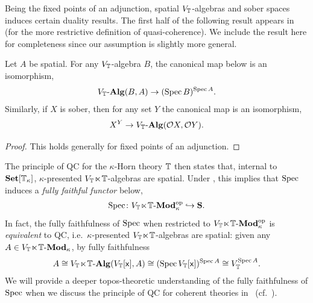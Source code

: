 Being the fixed points of an adjunction, spatial ${V_{\mathbb{T}}}$-algebras and sober spaces induces certain duality results. The first half of the following result appears in~\citet[Prop.~2.2.1]{Cherubini_Coquand_Hutzler_2024} (for the more restrictive definition of quasi-coherence). We include the result here for completeness since our assumption is slightly more general.

\begin{proposition}\label{prop:duality}
  Let $A$ be spatial. For any ${V_{\mathbb{T}}}$-algebra $B$, the canonical map below is an isomorphism,
  \[ {V_{\mathbb{T}}}\text{-}\mathbf{Alg}(B,A) \to (\operatorname{Spec} B)^{\operatorname{Spec} A}. \] 
  Similarly, if $X$ is sober, then for any set $Y$ the canonical map is an isomorphism,
  \[ X^Y \to {V_{\mathbb{T}}}\text{-}\mathbf{Alg}(\mathcal{O} X,\mathcal{O} Y). \] 
\end{proposition}
\begin{proof}
  This holds generally for fixed points of an adjunction.
\end{proof}

\begin{remark}\label{rem:ageneralduality}
  The principle of \gls{QC} for the $\kappa$-Horn theory $\mathbb{T}$ then states that, internal to $\mathbf{Set}[\mathbb{T}_\kappa]$, $\kappa$-presented $V_{\mathbb{T}}\hspace{-.4ex}\ltimes\hspace{-.4ex}\mathbb{T}$-algebras are spatial. Under , this implies that $\operatorname{Spec}$ induces a \emph{fully faithful functor} below,
  \[ \operatorname{Spec} \colon V_{\mathbb{T}}\hspace{-.4ex}\ltimes\hspace{-.4ex}\mathbb{T}\text{-}\mathbf{Mod}_\kappa^{\mathrm{op}} \hookrightarrow \mathbf{S}. \]
  In fact, the fully faithfulness of $\operatorname{Spec}$ when restricted to $V_{\mathbb{T}}\hspace{-.4ex}\ltimes\hspace{-.4ex}\mathbb{T}\text{-}\mathbf{Mod}_\kappa^{\mathrm{op}}$ is \emph{equivalent} to \gls{QC}, i.e.\ $\kappa$-presented $V_{\mathbb{T}}\hspace{-.4ex}\ltimes\hspace{-.4ex}\mathbb{T}$-algebras are spatial: given any $A\in V_{\mathbb{T}}\hspace{-.4ex}\ltimes\hspace{-.4ex}\mathbb{T}\text{-}\mathbf{Mod}_\kappa$, by fully faithfulness
  \[ A \cong V_{\mathbb{T}}\hspace{-.4ex}\ltimes\hspace{-.4ex}\mathbb{T}\text{-}\mathbf{Alg}(V_{\mathbb{T}}[\mathsf{x}],A) \cong (\operatorname{Spec} V_{\mathbb{T}}[\mathsf{x}])^{\operatorname{Spec} A} \cong V_{\mathbb{T}}^{\operatorname{Spec} A}. \]
  We will provide a deeper topos-theoretic understanding of the fully faithfulness of $\operatorname{Spec}$ when we discuss the principle of \gls{QC} for coherent theories in~ (cf.~). 
\end{remark}
